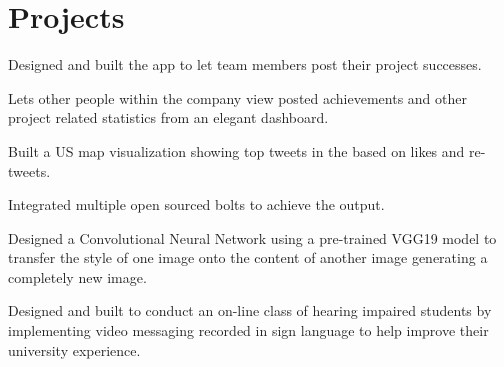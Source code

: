 \documentclass[]{rinkal_resume}
\begin{document}
\begin{minipage}[t]{0.69\textwidth}

\section{Projects}
\begin{tightemize}
\item Designed and built the app to let team members post their project successes.
\item Lets other people within the company view posted achievements and other project related statistics from an elegant dashboard.
\end{tightemize}
\sectionsep

\begin{tightemize}
\item Built a US map visualization showing top tweets in the based on likes and re-tweets.
\item Integrated multiple open sourced bolts to achieve the output.
\end{tightemize}
\sectionsep

\begin{tightemize}
\item Designed a Convolutional Neural Network using a pre-trained VGG19 model to transfer the style of one image onto the content of another image generating a completely new image.
\end{tightemize}
\sectionsep

\begin{tightemize}
\item Designed and built to conduct an on-line class of hearing impaired students by implementing video messaging recorded in sign language to help improve their university experience.
\end{tightemize}
\sectionsep



\end{minipage}
\end{document}
